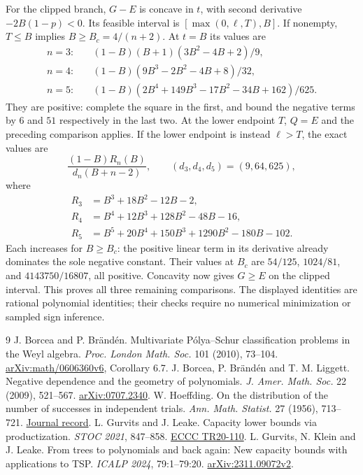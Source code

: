 \documentclass[11pt]{article}
\begin{document}
For the clipped branch, $G-E$ is concave in $t$, with second derivative
$-2B(1-p)<0$. Its feasible interval is $[\max(0,\ell,T),B]$.
If nonempty, $T\le B$ implies $B\ge B_c=4/(n+2)$.
At $t=B$ its values are
\begin{align*}
 n=3:&\quad(1-B)(B+1)(3B^2-4B+2)/9,\\
 n=4:&\quad(1-B)(9B^3-2B^2-4B+8)/32,\\
 n=5:&\quad(1-B)(2B^4+149B^3-17B^2-34B+162)/625.
\end{align*}
They are positive: complete the square in the first, and bound the
negative terms by $6$ and $51$ respectively in the last two.
At the lower endpoint $T$, $Q=E$ and the preceding comparison applies.
If the lower endpoint is instead $\ell>T$, the exact values are
\[
 \frac{(1-B)R_n(B)}{d_n(B+n-2)},\qquad
 (d_3,d_4,d_5)=(9,64,625),
\]
where
\begin{align*}
 R_3&=B^3+18B^2-12B-2,\\
 R_4&=B^4+12B^3+128B^2-48B-16,\\
 R_5&=B^5+20B^4+150B^3+1290B^2-180B-102.
\end{align*}
Each increases for $B\ge B_c$: the positive linear term in its
derivative already dominates the sole negative constant.
Their values at $B_c$ are $54/125$, $1024/81$, and
$4143750/16807$, all positive. Concavity now gives $G\ge E$
on the clipped interval. This proves all three remaining comparisons.
The displayed identities are rational polynomial identities; their
checks require no numerical minimization or sampled sign inference.

\begin{thebibliography}{9}
 J. Borcea and P. Br\"and\'en.
Multivariate P\'olya--Schur classification problems in the Weyl algebra.
\emph{Proc. London Math. Soc.} 101 (2010), 73--104.
\href{https://arxiv.org/abs/math/0606360v6}{arXiv:math/0606360v6}, Corollary 6.7.
 J. Borcea, P. Br\"and\'en and T. M. Liggett.
Negative dependence and the geometry of polynomials.
\emph{J. Amer. Math. Soc.} 22 (2009), 521--567.
\href{https://arxiv.org/abs/0707.2340}{arXiv:0707.2340}.
 W. Hoeffding.
On the distribution of the number of successes in independent trials.
\emph{Ann. Math. Statist.} 27 (1956), 713--721.
\href{https://www.jstor.org/stable/2237378}{Journal record}.
 L. Gurvits and J. Leake.
Capacity lower bounds via productization. \emph{STOC 2021}, 847--858.
\href{https://eccc.weizmann.ac.il/report/2020/110/}{ECCC TR20-110}.
 L. Gurvits, N. Klein and J. Leake.
From trees to polynomials and back again: New capacity bounds with
applications to TSP. \emph{ICALP 2024}, 79:1--79:20.
\href{https://arxiv.org/abs/2311.09072v2}{arXiv:2311.09072v2}.
\end{thebibliography}
\end{document}
